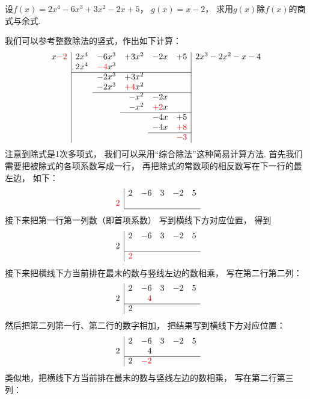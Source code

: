 \begin{example}
设\(f(x) = 2x^4-6x^3+3x^2-2x+5\)，
\(g(x) = x-2\)，
求用\(g(x)\)除\(f(x)\)的商式与余式.
\begin{solution}我们可以参考整数除法的竖式，作出如下计算：
\[
	\begin{array}{r|*5r|l}
		x{\color{red}-2} &
		2x^4 & -6x^3 & +3x^2 & -2x & +5
		& 2x^3-2x^2-x-4 \\
		& 2x^4 & {\color{red}-4}x^3 &&&& \\ \cline{2-6}
		&& -2x^3 & +3x^2 &&& \\
		&& -2x^3 & {\color{red}+4}x^2 &&& \\ \cline{3-6}
		&&& -x^2 & -2x && \\
		&&& -x^2 & {\color{red}+2}x && \\ \cline{4-6}
		&&&& -4x & +5 & \\
		&&&& -4x & {\color{red}+8} & \\ \cline{5-6}
		&&&&& {\color{red}-3}
	\end{array}
\]
注意到除式是1次多项式，
我们可以采用“综合除法”这种简易计算方法.
首先我们需要把被除式的各项系数写成一行，
再把除式的常数项的相反数写在下一行的最左边，
如下：\[
	\begin{array}{r|*5r}
		& 2 & -6 & 3 & -2 & 5 \\
		{\color{red}2} \\ \cline{2-6}
	\end{array}
\]
接下来把第一行第一列数（即首项系数）
写到横线下方对应位置，
得到\[
	\begin{array}{r|*5r}
		& 2 & -6 & 3 & -2 & 5 \\
		2 \\ \cline{2-6}
		& {\color{red}2}
	\end{array}
\]
接下来把横线下方当前排在最末的数与竖线左边的数相乘，
写在第二行第二列：\[
	\begin{array}{r|*5r}
		& 2 & -6 & 3 & -2 & 5 \\
		2 && {\color{red}4} \\ \cline{2-6}
		& 2
	\end{array}
\]
然后把第二列第一行、第二行的数字相加，
把结果写到横线下方对应位置：\[
	\begin{array}{r|*5r}
		& 2 & -6 & 3 & -2 & 5 \\
		2 && 4 \\ \cline{2-6}
		& 2 & {\color{red}-2}
	\end{array}
\]
类似地，把横线下方当前排在最末的数与竖线左边的数相乘，
写在第二行第三列：\[
\]
\end{solution}
\end{example}
